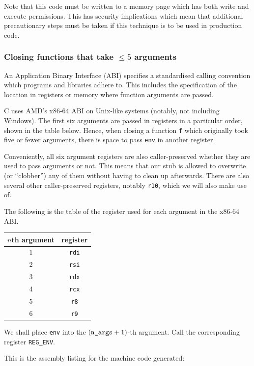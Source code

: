 \documentclass[12pt,a4paper,twoside,openright]{report}
\begin{document}
Note that this code must be written to a memory page which has both write and
execute permissions. This has security implications which mean that additional
precautionary steps must be taken if this technique is to be used in production
code.

\subsubsection{Closing functions that take $\le 5$ arguments}

An Application Binary Interface (ABI) specifies a standardised calling
convention which programs and libraries adhere to. This includes the
specification of the location in registers or memory where function arguments
are passed.

C uses AMD's x86-64 ABI on Unix-like systems (notably, not including Windows). The first
six arguments are passed in registers in a particular order,
shown in the table below. Hence, when closing a function \lstinline!f! which
originally took five or fewer arguments, there is space to pass \lstinline!env!
in another register.

Conveniently, all six argument registers are also caller-preserved whether they
are used to pass arguments or not. This means that our stub is allowed to
overwrite (or ``clobber'') any of them without having to clean up afterwards.
There are also several other caller-preserved registers, notably
\lstinline!r10!, which we will also make use of.

The following is the table of the register used for each argument in the x86-64
ABI.

\begin{center}
\begin{tabular}{ c | c }
  $n$th argument & register \\
  \hline
  1 & \lstinline!rdi! \\
  2 & \lstinline!rsi! \\
  3 & \lstinline!rdx! \\
  4 & \lstinline!rcx! \\
  5 & \lstinline!r8! \\
  6 & \lstinline!r9!
\end{tabular}
\end{center}

We shall place \lstinline!env! into the $(\text{\texttt{n\char`_args}}+1)$-th
argument. Call the corresponding register \lstinline!REG_ENV!.

This is the assembly listing for the machine code generated:
\end{document}
